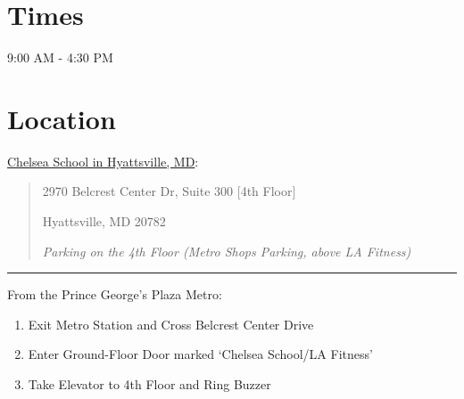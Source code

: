 \documentclass[letterpaper,10pt,english]{sphinxmanual}
\begin{document}
\section{Times}
\label{description:times}
9:00 AM - 4:30 PM


\section{Location}
\label{description:location}
\href{http://chelseaschool.edu/about/directions}{Chelsea School in Hyattsville, MD}:
\begin{quote}

2970 Belcrest Center Dr, Suite 300 {[}4th Floor{]}

Hyattsville, MD 20782

\emph{Parking on the 4th Floor (Metro Shops Parking, above LA Fitness)}
\end{quote}


\bigskip\hrule{}\bigskip


From the Prince George's Plaza Metro:
\begin{enumerate}
\item {} 
Exit Metro Station and Cross Belcrest Center Drive

\item {} 
Enter Ground-Floor Door marked `Chelsea School/LA Fitness'

\item {} 
Take Elevator to 4th Floor and Ring Buzzer

\end{enumerate}
\end{document}
